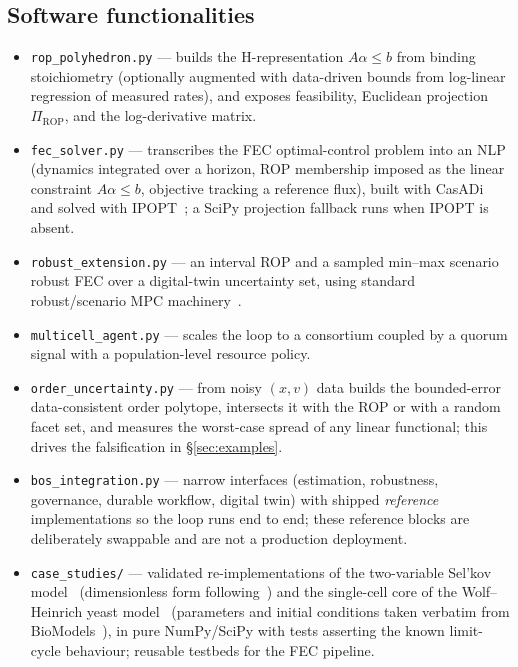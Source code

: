 \documentclass[11pt]{article}
\newcommand{\rop}{\mathrm{ROP}}
\newcommand{\code}[1]{\texttt{#1}}
\begin{document}
\subsection{Software functionalities}
\begin{itemize}\setlength\itemsep{1pt}
\item \code{rop\_polyhedron.py} --- builds the H-representation $A\alpha\le b$ from binding
stoichiometry (optionally augmented with data-driven bounds from log-linear regression of
measured rates), and exposes feasibility, Euclidean projection $\Pi_{\rop}$, and the
log-derivative matrix.
\item \code{fec\_solver.py} --- transcribes the FEC optimal-control problem into an NLP
(dynamics integrated over a horizon, ROP membership imposed as the linear constraint
$A\alpha\le b$, objective tracking a reference flux), built with
CasADi~\citep{andersson2019casadi} and solved with IPOPT~\citep{wachter2006ipopt}; a SciPy
projection fallback runs when IPOPT is absent.
\item \code{robust\_extension.py} --- an interval ROP and a sampled min--max scenario robust
FEC over a digital-twin uncertainty set, using standard robust/scenario MPC
machinery~\citep{kothare1996robust,scokaert1998minmax,mayne2005tube,calafiore2006scenario,campi2008exact,bertsimas2011robust}.
\item \code{multicell\_agent.py} --- scales the loop to a consortium coupled by a quorum
signal with a population-level resource policy.
\item \code{order\_uncertainty.py} --- from noisy $(x,v)$ data builds the bounded-error
data-consistent order polytope, intersects it with the ROP or with a random facet set, and
measures the worst-case spread of any linear functional; this drives the falsification in
\S\ref{sec:examples}.
\item \code{bos\_integration.py} --- narrow interfaces (estimation, robustness, governance,
durable workflow, digital twin) with shipped \emph{reference} implementations so the loop
runs end to end; these reference blocks are deliberately swappable and are not a production deployment.
\item \code{case\_studies/} --- validated re-implementations of the two-variable Sel'kov
model~\citep{selkov1968} (dimensionless form following~\citep{strogatz2014nonlinear}) and the
single-cell core of the Wolf--Heinrich yeast model~\citep{wolf2000} (parameters and initial
conditions taken verbatim from BioModels~\citep{biomd691}), in pure NumPy/SciPy with tests asserting the known limit-cycle
behaviour; reusable testbeds for the FEC pipeline.
\end{itemize}
\end{document}

